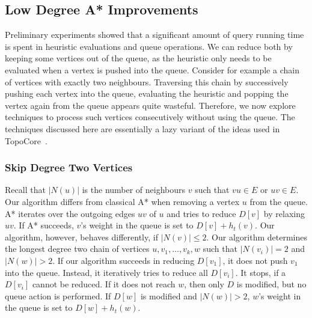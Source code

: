 \documentclass[manuscript,review]{acmart}
\begin{document}
\subsection{Low Degree A* Improvements}\label{sec:low-deg-improvment}

Preliminary experiments showed that a significant amount of query running time is spent in heuristic evaluations and queue operations.
We can reduce both by keeping some vertices out of the queue, as the heuristic only needs to be evaluated when a vertex is pushed into the queue.
Consider for example a chain of vertices with exactly two neighbours.
Traversing this chain by successively pushing each vertex into the queue, evaluating the heuristic and popping the vertex again from the queue appears quite wasteful.
Therefore, we now explore techniques to process such vertices consecutively without using the queue.
The techniques discussed here are essentially a lazy variant of the ideas used in TopoCore~\cite{DBLP:conf/gis/DibbeltSW15}.


\subsubsection{Skip Degree Two Vertices}

Recall that $|N(u)|$ is the number of neighbours $v$ such that $vu \in E$ or $uv \in E$.
Our algorithm differs from classical A* when removing a vertex $u$ from the queue.
A* iterates over the outgoing edges $uv$ of $u$ and tries to reduce $D[v]$ by relaxing $uv$.
If A* succeeds, $v$'s weight in the queue is set to $D[v]+h_t(v)$.
Our algorithm, however, behaves differently, if $|N(v)|\le 2$.
Our algorithm determines the longest degree two chain of vertices $u, v_1,\ldots, v_k, w$ such that $|N(v_i)|=2$ and $|N(w)| > 2$.
If our algorithm succeeds in reducing $D[v_1]$, it does not push $v_1$ into the queue.
Instead, it iteratively tries to reduce all $D[v_i]$.
It stops, if a $D[v_i]$ cannot be reduced.
If it does not reach $w$, then only $D$ is modified, but no queue action is performed.
If $D[w]$ is modified and $|N(w)|>2$, $w$'s weight in the queue is set to $D[w]+h_t(w)$.
\end{document}
